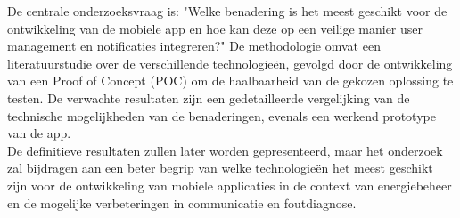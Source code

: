 De centrale onderzoeksvraag is: "Welke benadering is het meest geschikt voor de ontwikkeling van de mobiele app en hoe kan deze op een veilige manier user management en notificaties integreren?" De methodologie omvat een literatuurstudie over de verschillende technologieën, gevolgd door de ontwikkeling van een Proof of Concept (POC) om de haalbaarheid van de gekozen oplossing te testen. De verwachte resultaten zijn een gedetailleerde vergelijking van de technische mogelijkheden van de benaderingen, evenals een werkend prototype van de app. \\

De definitieve resultaten zullen later worden gepresenteerd, maar het onderzoek zal bijdragen aan een beter begrip van welke technologieën het meest geschikt zijn voor de ontwikkeling van mobiele applicaties in de context van energiebeheer en de mogelijke verbeteringen in communicatie en foutdiagnose.
